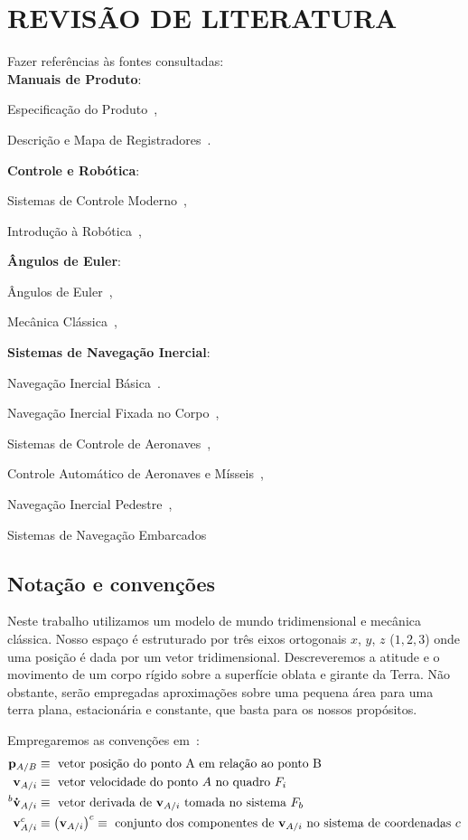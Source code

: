\chapter{REVISÃO DE LITERATURA}\label{chap:fundamentacaoTeorica}

Fazer referências às fontes consultadas:
\\

\textbf{Manuais de Produto}:

Especificação do Produto~\cite{mpu6050ps},

Descrição e Mapa de Registradores~\cite{mpu6050rm}.

\textbf{Controle e Robótica}:

Sistemas de Controle Moderno~\cite{Ogata2010},

Introdução à Robótica~\cite{Craig2014},

\textbf{Ângulos de Euler}:

Ângulos de Euler~\cite{Henderson1997},

Mecânica Clássica~\cite{Goldstein1980},

\textbf{Sistemas de Navegação Inercial}:

Navegação Inercial Básica~\cite{Stovall1997}.

Navegação Inercial Fixada no Corpo~\cite{Weston2004},

Sistemas de Controle de Aeronaves~\cite{Stevens2016},

Controle Automático de Aeronaves e Mísseis~\cite{Blakelock1991},

Navegação Inercial Pedestre~\cite{Wang2021},

Sistemas de Navegação Embarcados~\cite{Haoran2019}

\section{Notação e convenções}

Neste trabalho utilizamos um modelo de mundo tridimensional e mecânica clássica.  Nosso espaço é estruturado por três eixos ortogonais \(x\), \(y\), \(z\) (\(1, 2, 3\)) onde uma posição é dada por um vetor tridimensional. Descreveremos a atitude e o movimento de um corpo rígido sobre a superfície oblata e girante da Terra. Não obstante, serão empregadas aproximações sobre uma pequena área para uma terra plana, estacionária e constante, que basta\footnotemark{} para os nossos propósitos.

Empregaremos as convenções em~\cite{Stevens2016}:
\begin{align*}
    \mathbf{p}_{A/B} &\equiv
    \text{ vetor posição do ponto A em relação ao ponto B} \\
    \mathbf{v}_{A/i} &\equiv
    \text{ vetor velocidade do ponto \(A\) no quadro \(F_{i}\)} \\
    ^{b}\mathbf{\dot{v}}_{A/i} &\equiv
    \text{ vetor derivada de \(\mathbf{v}_{A/i}\) tomada no sistema \( F_{b}\)} \\
    \mathbf{v}^{c}_{A/i} &\equiv \left( \mathbf{v}_{A/i} \right)^{c} \equiv
    \text{ conjunto dos componentes de \(\mathbf{v}_{A/i}\) no sistema de coordenadas \(c\)} \\
\end{align*}

